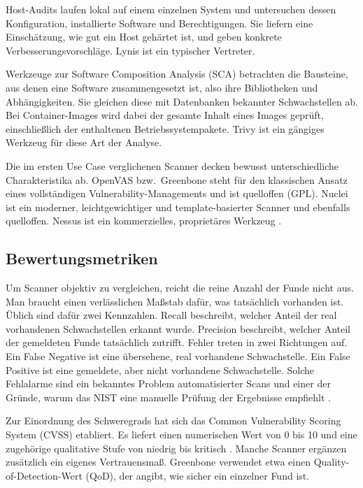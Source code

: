 Host-Audits laufen lokal auf einem einzelnen System und untersuchen dessen Konfiguration,
installierte Software und Berechtigungen. Sie liefern eine Einschätzung, wie gut ein Host gehärtet
ist, und geben konkrete Verbesserungsvorschläge. Lynis ist ein typischer Vertreter.

Werkzeuge zur Software Composition Analysis (SCA) betrachten die Bausteine, aus denen eine Software
zusammengesetzt ist, also ihre Bibliotheken und Abhängigkeiten. Sie gleichen diese mit Datenbanken
bekannter Schwachstellen ab. Bei Container-Images wird dabei der gesamte Inhalt eines Images
geprüft, einschließlich der enthaltenen Betriebssystempakete. Trivy ist ein gängiges Werkzeug für
diese Art der Analyse.

Die im ersten Use Case verglichenen Scanner decken bewusst unterschiedliche Charakteristika
ab. OpenVAS bzw.\ Greenbone steht für den klassischen Ansatz eines vollständigen
Vulnerability-Managements und ist quelloffen (GPL). Nuclei ist ein moderner, leichtgewichtiger und
template-basierter Scanner und ebenfalls quelloffen. Nessus ist ein kommerzielles, proprietäres
Werkzeug \cite[68]{IntroductionCyberRanges2022}.

\subsection{Bewertungsmetriken}
\label{subsec:scan-metriken}

Um Scanner objektiv zu vergleichen, reicht die reine Anzahl der Funde nicht aus. Man braucht einen
verlässlichen Maßstab dafür, was tatsächlich vorhanden ist. Üblich sind dafür zwei Kennzahlen.
Recall beschreibt, welcher Anteil der real vorhandenen Schwachstellen erkannt wurde. Precision
beschreibt, welcher Anteil der gemeldeten Funde tatsächlich zutrifft. Fehler treten in zwei
Richtungen auf. Ein False Negative ist eine übersehene, real vorhandene Schwachstelle. Ein False
Positive ist eine gemeldete, aber nicht vorhandene Schwachstelle. Solche Fehlalarme sind ein
bekanntes Problem automatisierter Scans und einer der Gründe, warum das NIST eine manuelle Prüfung
der Ergebnisse empfiehlt \cite{NISTSP800115}.

Zur Einordnung des Schweregrads hat sich das Common Vulnerability Scoring System (CVSS) etabliert.
Es liefert einen numerischen Wert von 0 bis 10 und eine zugehörige qualitative Stufe von niedrig
bis kritisch \cite{CVSSv4}. Manche Scanner ergänzen zusätzlich ein eigenes Vertrauensmaß. Greenbone
verwendet etwa einen Quality-of-Detection-Wert (QoD), der angibt, wie sicher ein einzelner Fund
ist.

